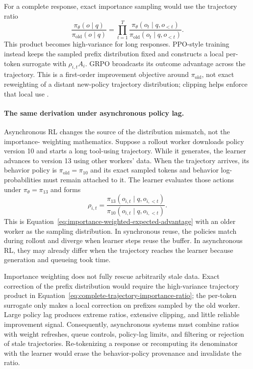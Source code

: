 For a complete response, exact importance sampling would use the trajectory ratio
\begin{equation}
  \frac{\pi_\theta(o\mid q)}{\pi_{\mathrm{old}}(o\mid q)}
  = \prod_{t=1}^{T}
    \frac{\pi_\theta(o_t\mid q,o_{<t})}
         {\pi_{\mathrm{old}}(o_t\mid q,o_{<t})}.
  \label{eq:complete-trajectory-importance-ratio}
\end{equation}
This product becomes high-variance for long responses. PPO-style training instead keeps
the sampled prefix distribution fixed and constructs a local per-token surrogate with
$\rho_{i,t}A_i$. GRPO broadcasts its outcome advantage across the trajectory. This is a
first-order improvement objective around $\pi_{\mathrm{old}}$, not exact reweighting of a
distant new-policy trajectory distribution; clipping helps enforce that local use
\citep{schulman2017ppo}.

\paragraph{The same derivation under asynchronous policy lag.}
Asynchronous RL changes the source of the distribution mismatch, not the importance-
weighting mathematics. Suppose a rollout worker downloads policy version 10 and starts a
long tool-using trajectory. While it generates, the learner advances to version 13 using
other workers' data. When the trajectory arrives, its behavior policy is
$\pi_{\mathrm{old}}=\pi_{10}$ and its exact sampled tokens and behavior log-probabilities
must remain attached to it. The learner evaluates those actions under
$\pi_\theta=\pi_{13}$ and forms
\begin{equation}
  \rho_{i,t}
  = \frac{\pi_{13}(o_{i,t}\mid q,o_{i,<t})}
         {\pi_{10}(o_{i,t}\mid q,o_{i,<t})}.
  \label{eq:asynchronous-policy-lag-ratio}
\end{equation}
This is Equation~\ref{eq:importance-weighted-expected-advantage} with an older worker as
the sampling distribution. In synchronous reuse, the policies match during rollout and
diverge when learner steps reuse the buffer. In asynchronous RL, they may already differ
when the trajectory reaches the learner because generation and queueing took time.

Importance weighting does not fully rescue arbitrarily stale data. Exact correction of the
prefix distribution would require the high-variance trajectory product in
Equation~\ref{eq:complete-trajectory-importance-ratio}; the per-token surrogate only makes
a local correction on prefixes sampled by the old worker. Large policy lag produces
extreme ratios, extensive clipping, and little reliable improvement signal. Consequently,
asynchronous systems must combine ratios with weight refreshes, queue controls, policy-lag
limits, and filtering or rejection of stale trajectories. Re-tokenizing a response or
recomputing its denominator with the learner would erase the behavior-policy provenance
and invalidate the ratio.

